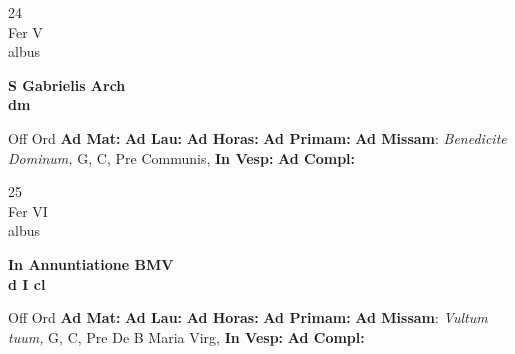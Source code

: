 \documentclass[10pt, openany]{book}
\begin{document}
        \begin{center}
            \begin{minipage}{3.5in}
                \vspace{2em}
                \begin{minipage}{0.5in}
                    {\Huge 24} \\
                    {\normalsize Fer V} \\
                    {\normalsize albus}
                \end{minipage}
                \begin{minipage}{3.0in}
                    \textbf{ \large S Gabrielis Arch \\
                    \textnormal{\normalsize dm}} \\ 
                \end{minipage}
                \begin{justify}Off Ord
                    \textbf{Ad Mat: }
                    \textbf{Ad Lau: }
                    \textbf{Ad Horas: }
                    \textbf{Ad Primam: }\textbf{Ad Missam}: \textit{Benedicite Dominum,} G, C, Pre Communis,  
                    \textbf{In Vesp: }
                    \textbf{Ad Compl: }
                \end{justify}
            \end{minipage}
        \end{center}
    
        \begin{center}
            \begin{minipage}{3.5in}
                \vspace{2em}
                \begin{minipage}{0.5in}
                    {\Huge 25} \\
                    {\normalsize Fer VI} \\
                    {\normalsize albus}
                \end{minipage}
                \begin{minipage}{3.0in}
                    \textbf{ \large In Annuntiatione BMV \\
                    \textnormal{\normalsize d I cl}} \\ 
                \end{minipage}
                \begin{justify}Off Ord
                    \textbf{Ad Mat: }
                    \textbf{Ad Lau: }
                    \textbf{Ad Horas: }
                    \textbf{Ad Primam: }\textbf{Ad Missam}: \textit{Vultum tuum,} G, C, Pre De B Maria Virg,  
                    \textbf{In Vesp: }
                    \textbf{Ad Compl: }
                \end{justify}
            \end{minipage}
        \end{center}
    
\end{document}
